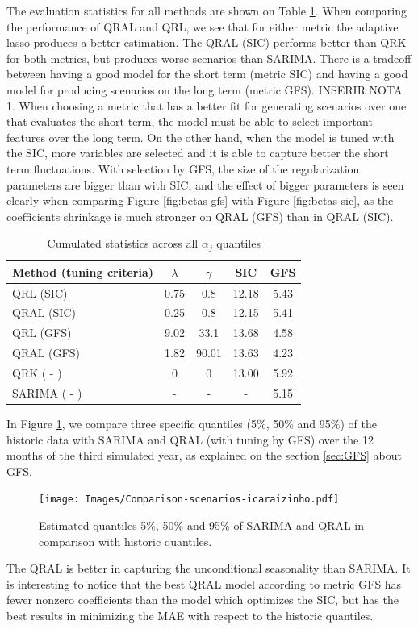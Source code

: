The evaluation statistics for all methods are shown on Table \ref{tab:results-icaraizinho}. When comparing the performance  of QRAL and QRL, we see that for either metric the adaptive lasso produces a better estimation. 
The QRAL (SIC) performs better than QRK for both metrics, but produces worse scenarios than SARIMA. 
There is a tradeoff between having a good model for the short term (metric SIC) and having a good model for producing scenarios on the long term (metric GFS). INSERIR NOTA 1.
When choosing a metric that has a better fit for generating scenarios over one that evaluates the short term, the model must be able to select important features over the long term. On the other hand, when the model is tuned with the SIC, more variables are selected and it is able to capture better the short term fluctuations.
With selection by GFS, the size of the regularization parameters are bigger than with SIC, and the effect of bigger parameters is seen clearly when comparing Figure \ref{fig:betas-gfs} with Figure \ref{fig:betas-sic}, as the coefficients shrinkage is much stronger on QRAL (GFS) than in QRAL (SIC).
\begin{table}[h]
	\centering
	\caption{Cumulated statistics across all $\alpha_j$ quantiles}
	\label{tab:results-icaraizinho}
	\begin{tabular}{|l|c|c|c|c|}
		\hline 
		Method (tuning criteria) & $\lambda$ & $\gamma$ & SIC & GFS\tabularnewline
		\hline 
		\hline 
		QRL   (SIC) & 0.75 & 0.8 & 12.18 & 5.43\tabularnewline
		\hline 
		QRAL   (SIC) & 0.25 & 0.8 & 12.15 & 5.41\tabularnewline
		\hline 
		QRL    (GFS) & 9.02 & 33.1 & 13.68 & 4.58\tabularnewline
		\hline 
		QRAL   (GFS) & 1.82 & 90.01 & 13.63 & 4.23\tabularnewline
		\hline 
		QRK    ( - ) & 0 & 0 & 13.00 & 5.92 \tabularnewline
		\hline 
		SARIMA ( - ) & - & - & - & 5.15 \tabularnewline
		\hline 	
	\end{tabular}
	\end{table}
	


In Figure \ref{fig:simulated-quantiles}, we compare three specific quantiles (5\%, 50\% and 95\%) of the historic data with SARIMA and QRAL (with tuning by GFS) over the 12 months of the third simulated year, as explained on the section  \ref{sec:GFS} about GFS. 
\begin{figure}[h]
	\centering
	\texttt{[image: Images/Comparison-scenarios-icaraizinho.pdf]}
	\caption{Estimated quantiles 5\%, 50\% and 95\% of SARIMA and QRAL in comparison with historic quantiles.}
	\label{fig:simulated-quantiles}
\end{figure}
The QRAL is better in capturing the unconditional seasonality than SARIMA. It is interesting to notice that the best QRAL model according to metric GFS has fewer nonzero coefficients than the model which optimizes the SIC, but has the best results in minimizing the MAE with respect to the historic quantiles.  

